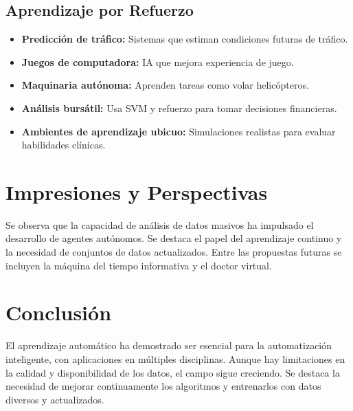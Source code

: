 \documentclass[12pt]{article}
\begin{document}
\subsection{Aprendizaje por Refuerzo}
\begin{itemize}
  \item \textbf{Predicci\'on de tr\'afico:} Sistemas que estiman condiciones futuras de tr\'afico.
  \item \textbf{Juegos de computadora:} IA que mejora experiencia de juego.
  \item \textbf{Maquinaria aut\'onoma:} Aprenden tareas como volar helic\'opteros.
  \item \textbf{An\'alisis burs\'atil:} Usa SVM y refuerzo para tomar decisiones financieras.
  \item \textbf{Ambientes de aprendizaje ubicuo:} Simulaciones realistas para evaluar habilidades cl\'inicas.
\end{itemize}

\section{Impresiones y Perspectivas}
Se observa que la capacidad de an\'alisis de datos masivos ha impulsado el desarrollo de agentes aut\'onomos. Se destaca el papel del aprendizaje continuo y la necesidad de conjuntos de datos actualizados. Entre las propuestas futuras se incluyen la m\'aquina del tiempo informativa y el doctor virtual.

\section{Conclusi\'on}
El aprendizaje autom\'atico ha demostrado ser esencial para la automatizaci\'on inteligente, con aplicaciones en m\'ultiples disciplinas. Aunque hay limitaciones en la calidad y disponibilidad de los datos, el campo sigue creciendo. Se destaca la necesidad de mejorar continuamente los algoritmos y entrenarlos con datos diversos y actualizados.
\end{document}
